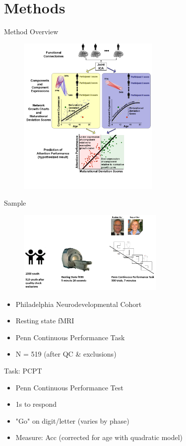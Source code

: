 \documentclass[presentation]{beamer}
\begin{document}
\section{Methods}
\label{sec:orgheadline19}
\begin{frame}[label={sec:orgheadline4}]{Method Overview}
\begin{figure}[htb]
\centering
\includegraphics[height=7.75cm]{./Figures/Figure1.png}
\end{figure}
\end{frame}
\begin{frame}[label={sec:orgheadline5}]{Sample}
\begin{figure}[htb]
\centering
\includegraphics[height=4cm]{./Figures/PNC.png}
\end{figure}
\begin{itemize}
\item Philadelphia Neurodevelopmental Cohort
\item Resting state fMRI
\item Penn Continuous Performance Task
\item N = 519 (after QC \& exclusions)
\end{itemize}
\end{frame}
\begin{frame}[label={sec:orgheadline6}]{Task: PCPT}
\begin{itemize}
\item Penn Continuous Performance Test
\item 1s to respond
\item "Go" on digit/letter (varies by phase)
\item Measure: Acc (corrected for age with quadratic model)
\end{itemize}
\end{frame}
\end{document}
